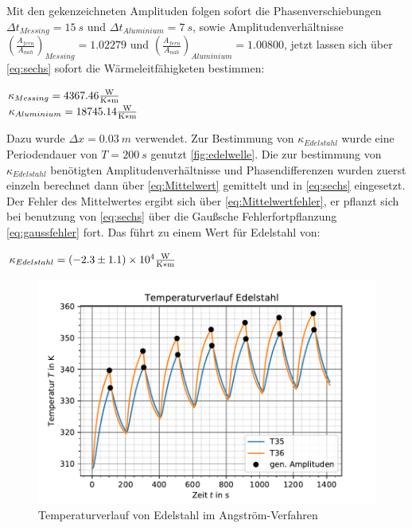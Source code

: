   Mit den gekenzeichneten Amplituden folgen sofort die Phasenverschiebungen $\Delta t_{Messing}=\SI[]{15}[]{s}$ 
  und $\Delta t_{Aluminium}=\SI[]{7}[]{s}$, sowie Amplitudenverhältnisse $(\frac{A_{fern}}{A_{nah}})_{Messing}=1.02279$ und $(\frac{A_{fern}}{A_{nah}})_{Aluminium}=1.00800$,
  jetzt lassen sich über \autoref{eq:sechs} sofort die Wärmeleitfähigketen bestimmen:
  \begin{center}
      $\kappa_{Messing}=4367.46\si[]{\frac{W}{K*m}}$\\
      $\kappa_{Aluminium}=18745.14\si[]{\frac{W}{K*m}}$
  \end{center}
  Dazu wurde $\Delta x=\SI[]{0.03}[]{m}$ verwendet.
  Zur Bestimmung von $\kappa_{Edelstahl}$ wurde eine Periodendauer von $T=\SI[]{200}[]{s}$ genutzt \autoref{fig:edelwelle}.
  Die zur bestimmung von $\kappa_{Edelstahl}$ benötigten Amplitudenverhältnisse und Phasendifferenzen
  wurden zuerst einzeln berechnet dann über \autoref{eq:Mittelwert} gemittelt und in \autoref{eq:sechs}
  eingesetzt. Der Fehler des Mittelwertes ergibt sich über \autoref{eq:Mittelwertfehler}, er pflanzt sich bei benutzung
  von \autoref{eq:sechs} über die Gaußsche Fehlerfortpflanzung \autoref{eq:gaussfehler} fort. 
  Das führt zu einem Wert für Edelstahl von:
  \begin{center}
      $\kappa_{Edelstahl}=(-2.3\pm 1.1)\times 10^{4}\si[]{\frac{W}{K*m}}$
  \end{center}
  \begin{figure}
    \centering
    \includegraphics{welleedelstahl.pdf}
    \caption{Temperaturverlauf von Edelstahl im Angström-Verfahren}
    \label{fig:edelwelle}
  \end{figure}

